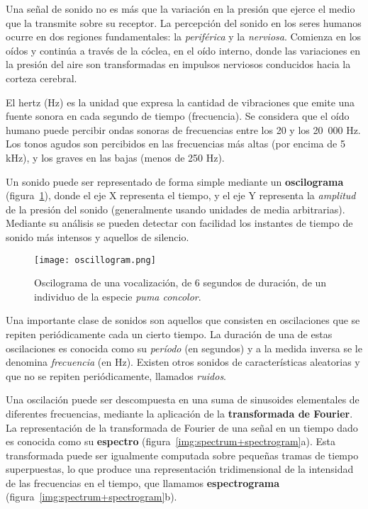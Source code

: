 Una señal de sonido no es más que la variación en la presión que ejerce el medio que la transmite sobre su receptor.
La percepción del sonido en los seres humanos ocurre en dos regiones fundamentales: la \textit{periférica} y la \textit{nerviosa}.
Comienza en los oídos y continúa a través de la cóclea, en el oído interno, donde las variaciones en la presión del aire son transformadas en impulsos nerviosos conducidos hacia la corteza cerebral.

El hertz (Hz) es la unidad que expresa la cantidad de vibraciones que emite una fuente sonora en cada segundo de tiempo (frecuencia).
Se considera que el oído humano puede percibir ondas sonoras de frecuencias entre los 20 y los 20~000 Hz.
Los tonos agudos son percibidos en las frecuencias más altas (por encima de 5 kHz), y los graves en las bajas (menos de 250 Hz).

Un sonido puede ser representado de forma simple mediante un \textbf{oscilograma} (figura~\ref{img:oscillogram}), donde el eje X representa el tiempo, y el eje Y representa la \textit{amplitud} de la presión del sonido (generalmente usando unidades de media arbitrarias).
Mediante su análisis se pueden detectar con facilidad los instantes de tiempo de sonido más intensos y aquellos de silencio.

\begin{figure}[!h]
    \centering
    \texttt{[image: oscillogram.png]}
    \caption{Oscilograma de una vocalización, de 6 segundos de duración, de un individuo de la especie \textit{puma concolor}.}
    \label{img:oscillogram}
\end{figure}

Una importante clase de sonidos son aquellos que consisten en oscilaciones que se repiten periódicamente cada un cierto tiempo.
La duración de una de estas oscilaciones es conocida como su \textit{período} (en segundos) y a la medida inversa se le denomina \textit{frecuencia} (en Hz).
Existen otros sonidos de características aleatorias y que no se repiten periódicamente, llamados \textit{ruidos}.

Una oscilación puede ser descompuesta en una suma de sinusoides elementales de diferentes frecuencias, mediante la aplicación de la \textbf{transformada de Fourier}.
La representación de la transformada de Fourier de una señal en un tiempo dado es conocida como su \textbf{espectro} (figura~\ref{img:spectrum+spectrogram}a).
Esta transformada puede ser igualmente computada sobre pequeñas tramas de tiempo superpuestas, lo que produce una representación tridimensional de la intensidad de las frecuencias en el tiempo, que llamamos \textbf{espectrograma} (figura~\ref{img:spectrum+spectrogram}b).

